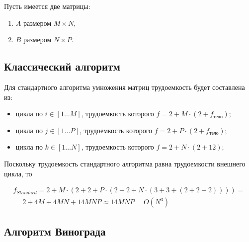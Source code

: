 Пусть имеется две матрицы:

\begin{enumerate}
    \item $A$ размером $M \times N$,
    \item $B$ размером $N \times P$.
\end{enumerate}

\subsection{Классический алгоритм}

Для стандартного алгоритма умножения матриц трудоемкость будет составлена из:

\begin{itemize}
    \item цикла по $i \in [1 \ldots M]$, трудоемкость которого $f = 2 + M \cdot (2 + f_\text{тело})$;
    \item цикла по $j \in [1 \ldots P]$, трудоемкость которого $f = 2 + P \cdot (2 + f_\text{тело})$;
    \item цикла по $k \in [1 \ldots N]$, трудоемкость которого $f = 2 + N \cdot (2 + 12)$;
\end{itemize}

Поскольку трудоемкость стандартного алгоритма равна трудоемкости внешнего цикла, то

\begin{equation}
    \begin{gathered}
        f_{Standard} = 2 + M \cdot (2 + 2 + P \cdot (2 + 2 + N \cdot (3 + 3 + (2 + 2 + 2)))) = \\
        = 2 + 4M + 4MN + 14MNP \approx 14MNP = O(N^3)
    \end{gathered}
\end{equation}

\subsection{Алгоритм Винограда}

